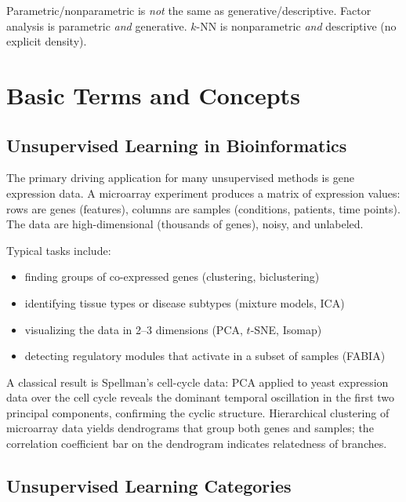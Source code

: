 \documentclass[11pt, oneside]{book}
\begin{document}
\begin{notebox}[title={Exam trap}]
Parametric/nonparametric is \emph{not} the same as generative/descriptive.
Factor analysis is parametric \emph{and} generative.
$k$-NN is nonparametric \emph{and} descriptive (no explicit density).
\end{notebox}


\chapter{Basic Terms and Concepts}

\section{Unsupervised Learning in Bioinformatics}

The primary driving application for many unsupervised methods is gene expression data.
A microarray experiment produces a matrix of expression values: rows are genes (features),
columns are samples (conditions, patients, time points).
The data are high-dimensional (thousands of genes), noisy, and unlabeled.

Typical tasks include:
\begin{itemize}
  \item finding groups of co-expressed genes (clustering, biclustering)
  \item identifying tissue types or disease subtypes (mixture models, ICA)
  \item visualizing the data in 2--3 dimensions (PCA, $t$-SNE, Isomap)
  \item detecting regulatory modules that activate in a subset of samples (FABIA)
\end{itemize}

A classical result is Spellman's cell-cycle data: PCA applied to yeast expression data
over the cell cycle reveals the dominant temporal oscillation in the first two principal
components, confirming the cyclic structure.
Hierarchical clustering of microarray data yields dendrograms that group both genes and
samples; the correlation coefficient bar on the dendrogram indicates relatedness of branches.


\section{Unsupervised Learning Categories}
\end{document}
